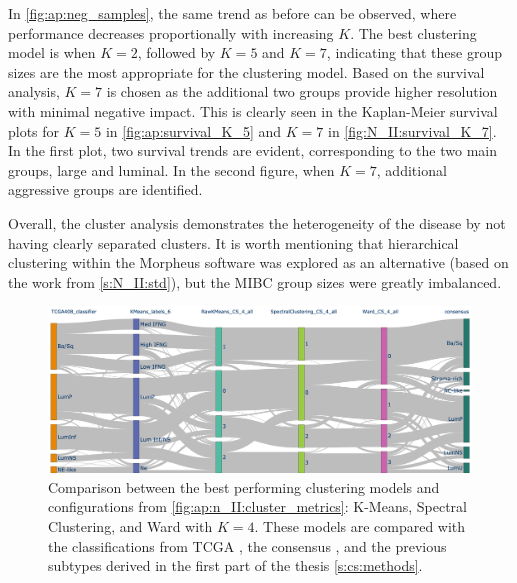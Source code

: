 In \cref{fig:ap:neg_samples}, the same trend as before can be observed, where performance decreases proportionally with increasing $K$. The best clustering model is when $K=2$, followed by $K=5$ and $K=7$, indicating that these group sizes are the most appropriate for the clustering model. Based on the survival analysis, $K=7$ is chosen as the additional two groups provide higher resolution with minimal negative impact. This is clearly seen in the Kaplan-Meier survival plots for $K=5$ in \cref{fig:ap:survival_K_5} and $K=7$ in \cref{fig:N_II:survival_K_7}. In the first plot, two survival trends are evident, corresponding to the two main groups, large and luminal. In the second figure, when $K=7$, additional aggressive groups are identified.

Overall, the cluster analysis demonstrates the heterogeneity of the disease by not having clearly separated clusters. It is worth mentioning that hierarchical clustering within the Morpheus software \cite{Broad-InstituteUnknown-kn} was explored as an alternative (based on the work from \cref{s:N_II:std}), but the MIBC group sizes were greatly imbalanced.

\begin{figure}[H]    
    \centering
    \includegraphics[width=1.0\textwidth,height=1.0\textheight,keepaspectratio]{Sections/Network_II/resources/reward/cluster_analysis/cluster_comp.png}
    \caption{Comparison between the best performing clustering models and configurations from \cref{fig:ap:n_II:cluster_metrics}: K-Means, Spectral Clustering, and Ward with $K=4$. These models are compared with the classifications from TCGA \citep{Robertson2017-mg}, the consensus \citep{Kamoun2020-tj}, and the previous subtypes derived in the first part of the thesis \cref{s:cs:methods}.}
    \label{fig:ap:cs_sankey}
\end{figure}

